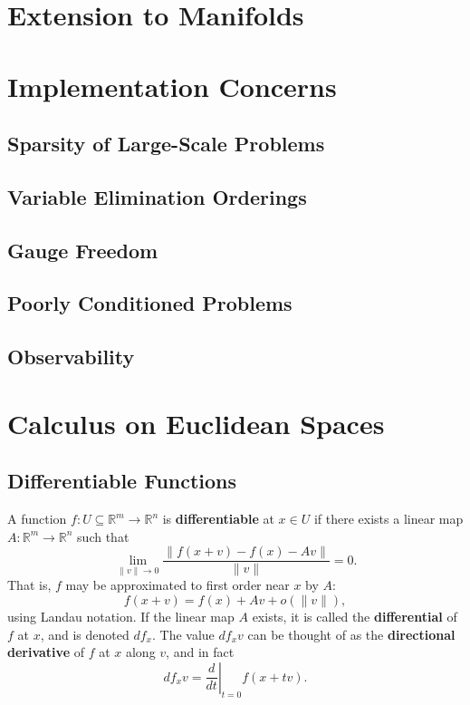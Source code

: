 \documentclass[reqno]{amsart}
\numberwithin{equation}{section}
\begin{document}
\section{Extension to Manifolds}

\section{Implementation Concerns}
\subsection{Sparsity of Large-Scale Problems}
\subsection{Variable Elimination Orderings}
\subsection{Gauge Freedom}
\subsection{Poorly Conditioned Problems}
\subsection{Observability}

\appendix

\section{Calculus on Euclidean Spaces}

\subsection{Differentiable Functions}

A function $f : U \subseteq \mathbb R^m \to \mathbb R^n$ is \textbf{differentiable} at $x \in U$
if there exists a linear map $A : \mathbb R^m \to \mathbb R^n$ such that
$$
    \lim_{\|v\| \to 0} \frac{\|f(x + v) - f(x) - A v\|}{\|v\|} = 0.
$$
That is, $f$ may be approximated to first order near $x$ by $A$:
$$
    f(x+v) = f(x) + A v + o(\|v\|),
$$
using Landau notation. If the linear map $A$ exists, it is called the \textbf{differential}
of $f$ at $x$, and is denoted $df_x$. The value $df_x v$ can be thought of as the
\textbf{directional derivative} of $f$ at $x$ along $v$, and in fact
$$
    df_x v = \left.\frac{d}{dt}\right|_{t=0}f(x + tv).
$$
\end{document}

